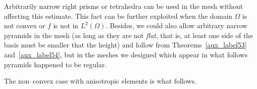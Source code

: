 Arbitrarily narrow right prisms or tetrahedra can be used in the mesh without 
affecting this estimate. This fact can be further exploited when the
domain $\Omega$ is not convex or $f$ is not in $L^2(\Omega)$. Besides, we could
also allow arbitrary narrow pyramids in the mesh (as long as they are not \textit{flat},
that is, at least one side of the basis must be smaller that the height) and
follow from Theorems~\ref{aux_label53} and~\ref{aux_label54}, but in the meshes we 
designed which appear in what follows pyramids happened to be regular. 

The non--convex case with anisotropic elements is what follows.
